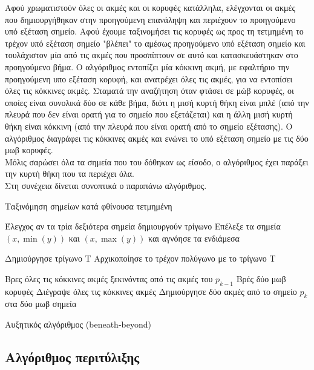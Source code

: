 \documentclass[oneside,12pt]{book}
\theoremstyle{definition}
\begin{document}
Αφού χρωματιστούν όλες οι ακμές και οι κορυφές κατάλληλα, ελέγχονται οι ακμές που δημιουργήθηκαν στην προηγούμενη επανάληψη και περιέχουν το προηγούμενο υπό εξέταση σημείο. Αφού έχουμε ταξινομήσει τις κορυφές ως προς τη τετμημένη το τρέχον υπό εξέταση σημείο "βλέπει" το αμέσως προηγούμενο υπό εξέταση σημείο και τουλάχιστον μία από τις ακμές που προσπίπτουν σε αυτό και κατασκευάστηκαν στο προηγούμενο βήμα. Ο αλγόριθμος εντοπίζει μία κόκκινη ακμή, με εφαλτήριο την προηγούμενη υπο εξέταση κορυφή, και ανατρέχει όλες τις ακμές, για να εντοπίσει όλες τις κόκκινες ακμές. Σταματά την αναζήτηση όταν φτάσει σε μώβ κορυφές, οι οποίες είναι συνολικά δύο σε κάθε βήμα, διότι η μισή κυρτή θήκη είναι μπλέ (από την πλευρά που δεν είναι ορατή για το σημείο που εξετάζεται) και η άλλη μισή κυρτή θήκη είναι κόκκινη (από την πλευρά που είναι ορατή από το σημείο εξέτασης). Ο αλγόριθμος διαγράφει τις κόκκινες ακμές και ενώνει το υπό εξέταση σημείο με τις δύο μωβ κορυφές. \\

Μόλις σαρώσει όλα τα σημεία που του δόθηκαν ως είσοδο, ο αλγόριθμος έχει παράξει την κυρτή θήκη που τα περιέχει όλα. \\

Στη συνέχεια δίνεται συνοπτικά ο παραπάνω αλγόριθμος. \\

\begin{algorithm}[H]
	\SetAlgoLined
		
	Ταξινόμηση σημείων κατά φθίνουσα τετμημένη \;
	
	Έλεγχος αν τα τρία δεξιότερα σημεία δημιουργούν τρίγωνο \;
	{Επέλεξε τα σημεία \((x, \min(y))\) και \((x, \max(y))\) και αγνόησε τα ενδιάμεσα\;}
	
	Δημιούργησε τρίγωνο Τ \;
	Αρχικοποίησε το τρέχον πολύγωνο με το τρίγωνο Τ \;
	
	{Βρες όλες τις κόκκινες ακμές ξεκινόντας από τις ακμές του \(p_{k-1}\) \;
		Βρές δύο μωβ κορυφές \;
		Διέγραψε όλες τις κόκκινες ακμές \;
		Δημιούργησε δύο ακμές από το σημείο \(p_k\) στα δύο μωβ σημεία \;
	}
	
	\caption{Αυξητικός αλγόριθμος (beneath-beyond)}
\end{algorithm}

\subsection{Αλγόριθμος περιτύλιξης}
\end{document}
